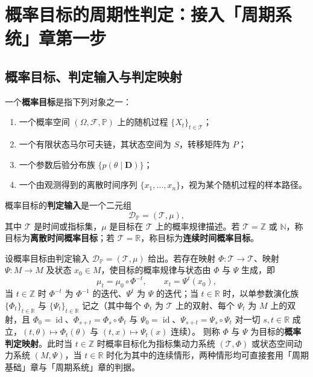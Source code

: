 \section{概率目标的周期性判定：接入「周期系统」章第一步}
\label{sec:prob_periodicity_decision}

\subsection{概率目标、判定输入与判定映射}

\begin{definition}[概率目标与判定输入]\label{def:prob_target}
一个\textbf{概率目标}是指下列对象之一：
\begin{enumerate}[label=(\roman*)]
    \item 一个概率空间 $(\Omega,\mathcal F,\mathbb P)$ 上的随机过程 $\{X_t\}_{t\in\mathcal T}$；
    \item 一个有限状态马尔可夫链，其状态空间为 $S$，转移矩阵为 $P$；
    \item 一个参数后验分布族 $\{p(\theta\mid \mathbf D)\}$；
    \item 一个由观测得到的离散时间序列 $\{x_1,\dots,x_n\}$，视为某个随机过程的样本路径。
\end{enumerate}
概率目标的\textbf{判定输入}是一个二元组
\[
\mathcal D_{\mathbb P}=(\mathcal T,\mu),
\]
其中 $\mathcal T$ 是时间或指标集，$\mu$ 是目标在 $\mathcal T$ 上的概率规律描述。若 $\mathcal T=\mathbb Z$ 或 $\mathbb N$，称目标为\textbf{离散时间概率目标}；若 $\mathcal T=\mathbb R$，称目标为\textbf{连续时间概率目标}。
\end{definition}

\begin{definition}[概率判定映射]\label{def:prob_periodization}
设概率目标由判定输入 $\mathcal D_{\mathbb P}=(\mathcal T,\mu)$ 给出。若存在映射 $\Phi:\mathcal T\to\mathcal T$、映射 $\Psi:M\to M$ 及状态 $x_0\in M$，使目标的概率规律与状态由 $\Phi$ 与 $\Psi$ 生成，即
\[
\mu_t=\mu_0\circ \Phi^{-t},\qquad x_t=\Psi^t(x_0),
\]
当 $t\in\mathbb Z$ 时 $\Phi^{-t}$ 为 $\Phi^{-1}$ 的迭代、$\Psi^t$ 为 $\Psi$ 的迭代；当 $t\in\mathbb R$ 时，以单参数演化族 $\{\Phi_t\}_{t\in\mathbb R}$ 与 $\{\Psi_t\}_{t\in\mathbb R}$ 记之（其中每个 $\Phi_t$ 为 $\mathcal T$ 上的双射、每个 $\Psi_t$ 为 $M$ 上的双射，且 $\Phi_0=\operatorname{id}$、$\Phi_{s+t}=\Phi_s\circ\Phi_t$ 与 $\Psi_0=\operatorname{id}$、$\Psi_{s+t}=\Psi_s\circ\Psi_t$ 对一切 $s,t\in\mathbb R$ 成立，$(t,\theta)\mapsto\Phi_t(\theta)$ 与 $(t,x)\mapsto\Psi_t(x)$ 连续）。
则称 $\Phi$ 与 $\Psi$ 为目标的\textbf{概率判定映射}。此时当 $t\in\mathbb Z$ 时概率目标化为指标集动力系统 $(\mathcal T,\Phi)$ 或状态空间动力系统 $(M,\Psi)$，当 $t\in\mathbb R$ 时化为其中的连续情形，两种情形均可直接套用「周期基础」章与「周期系统」章的判据。
\end{definition}

